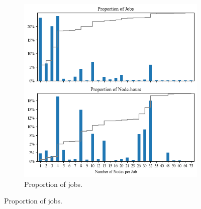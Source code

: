 \documentclass[a4paper,fleqn]{cas-dc}
\begin{document}
\begin{figure}[tbp]
\centering

\begin{subfigure}[t]{0.8\linewidth}
    \centering
    \includegraphics[clip,width=\linewidth,trim={0.1cm 8.1cm 0.1cm 0.75cm}]{figures/job_proportions.png}
    \caption{Proportion of jobs.}
    \label{fig:wl_distrib_runtime_size_top}
\end{subfigure}

\vspace{1em} %


\end{figure}
\end{document}
